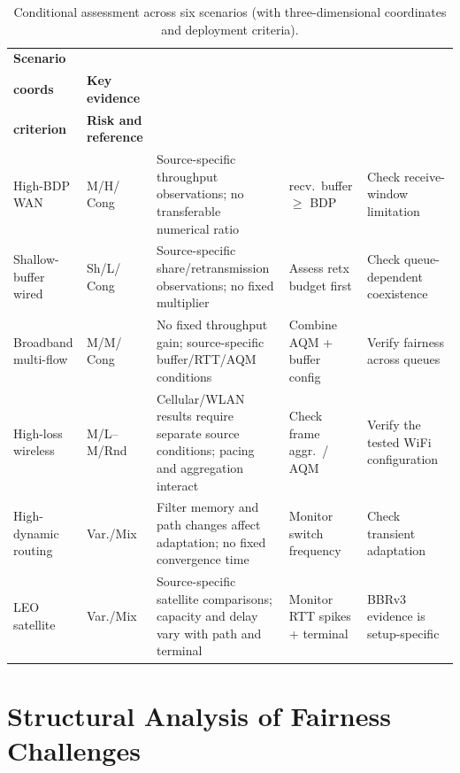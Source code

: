 \documentclass[a4paper,fleqn]{cas-sc}
\begin{document}
\begin{table}[pos=htbp]
  \caption{Conditional assessment across six scenarios
    (with three-dimensional coordinates and deployment criteria).}
  \label{tab:summary}
  \small
  \begin{tabularx}{\tblwidth}{@{}p{2.0cm}p{1.5cm}Xp{2.0cm}X@{}}
    \toprule
    \textbf{Scenario} & \makecell[l]{\textbf{3-D}\\\textbf{coords}} & \textbf{Key evidence}
      & \makecell[l]{\textbf{Deployment}\\\textbf{criterion}} & \textbf{Risk and reference} \\
    \midrule
    High-BDP WAN & M/H/ Cong & Source-specific throughput observations; no transferable numerical ratio &
      recv.\ buffer $\geq$ BDP & Check receive-window limitation~\citep{cardwell2017bbr} \\
    \midrule
    Shallow-buffer wired & Sh/L/ Cong & Source-specific share/retransmission observations; no fixed multiplier &
      Assess retx budget first & Check queue-dependent coexistence~\citep{cao2019bbr,jaeger2019bbr} \\
    \midrule
    Broadband multi-flow & M/M/ Cong & No fixed throughput gain; source-specific buffer/RTT/AQM conditions &
      Combine AQM + buffer config & Verify fairness across queues~\citep{gomez2024bbrv3} \\
    \midrule
    High-loss wireless & M/L--M/Rnd & Cellular/WLAN results require separate source conditions; pacing and aggregation interact &
      Check frame aggr.\ / AQM & Verify the tested WiFi configuration~\citep{atxutegi2018cellular,grazia2020bbrp} \\
    \midrule
    High-dynamic routing & Var./Mix & Filter memory and path changes affect adaptation; no fixed convergence time &
      Monitor switch frequency & Check transient adaptation~\citep{miyazawa2018cyclic} \\
    \midrule
    LEO satellite & Var./Mix & Source-specific satellite comparisons; capacity and delay vary with path and terminal &
      Monitor RTT spikes + terminal & BBRv3 evidence is setup-specific~\citep{deutschmann2023starlink,kamel2024starquic} \\
    \bottomrule
  \end{tabularx}
\end{table}

\FloatBarrier

\section{Structural Analysis of Fairness Challenges}
\label{sec:fairness}
\end{document}
